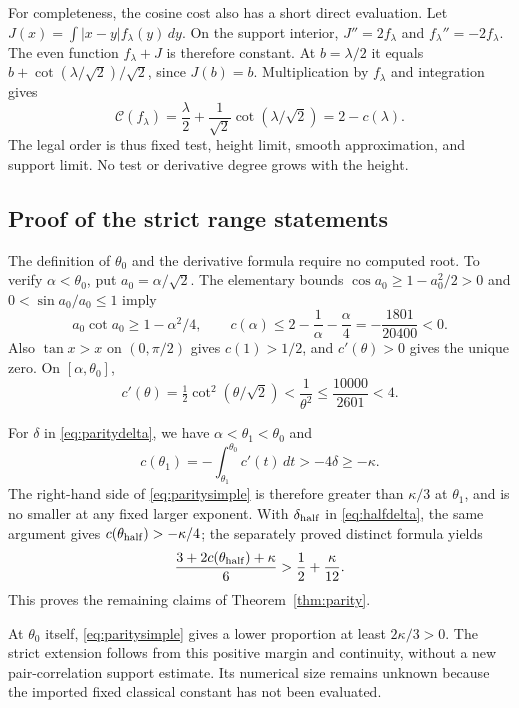 \documentclass[11pt]{article}
\theoremstyle{remark}
\newcommand{\cC}{\mathcal C}
\begin{document}
For completeness, the cosine cost also has a short direct evaluation.
Let $J(x)=\int|x-y|f_\lambda(y)\,dy$. On the support interior,
$J''=2f_\lambda$ and $f_\lambda''=-2f_\lambda$. The even function
$f_\lambda+J$ is therefore constant. At $b=\lambda/2$ it equals
$b+\cot(\lambda/\sqrt2)/\sqrt2$, since $J(b)=b$. Multiplication by
$f_\lambda$ and integration gives
\[
 \cC(f_\lambda)=\frac\lambda2+
               \frac1{\sqrt2}\cot(\lambda/\sqrt2)=2-c(\lambda).
\]
The legal order is thus fixed test, height limit, smooth approximation,
and support limit. No test or derivative degree grows with the height.

\subsection{Proof of the strict range statements}

The definition of $\theta_0$ and the derivative formula require no
computed root. To verify $\alpha<\theta_0$, put $a_0=\alpha/\sqrt2$.
The elementary bounds $\cos a_0\ge1-a_0^2/2>0$ and
$0<\sin a_0/a_0\le1$ imply
\[
 a_0\cot a_0\ge1-\alpha^2/4,
 \qquad c(\alpha)\le2-\frac1\alpha-\frac\alpha4
                  =-\frac{1801}{20400}<0.
\]
Also $\tan x>x$ on $(0,\pi/2)$ gives $c(1)>1/2$, and
$c'(\theta)>0$ gives the unique zero. On $[\alpha,\theta_0]$,
\begin{equation}\label{eq:derivativecap}
 c'(\theta)=\tfrac12\cot^2(\theta/\sqrt2)
     <\frac1{\theta^2}\le\frac{10000}{2601}<4.
\end{equation}

For $\delta$ in \eqref{eq:paritydelta}, we have
$\alpha<\theta_1<\theta_0$ and
\[
 c(\theta_1)=-\int_{\theta_1}^{\theta_0}c'(t)\,dt
             >-4\delta\ge-\kappa.
\]
The right-hand side of \eqref{eq:paritysimple} is therefore greater
than $\kappa/3$ at $\theta_1$, and is no smaller at any fixed larger
exponent. With $\delta_{\rm half}$ in \eqref{eq:halfdelta}, the same
argument gives $c(\theta_{\rm half})>-\kappa/4$; the separately proved
distinct formula yields
\[
 \frac{3+2c(\theta_{\rm half})+\kappa}{6}
      >\frac12+\frac\kappa{12}.
\]
This proves the remaining claims of Theorem~\ref{thm:parity}.

At $\theta_0$ itself, \eqref{eq:paritysimple} gives a lower proportion
at least $2\kappa/3>0$. The strict extension follows from this positive
margin and continuity, without a new pair-correlation support estimate.
Its numerical size remains unknown because the imported fixed classical
constant has not been evaluated.
\end{document}
